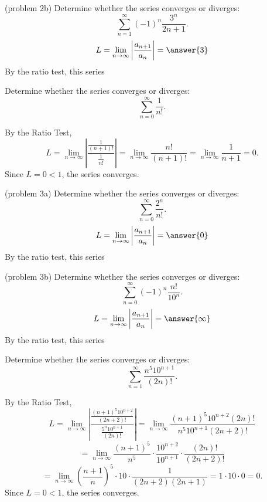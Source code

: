 \documentclass{ximera}
\begin{document}
\begin{problem}(problem 2b)
Determine whether the series converges or diverges:
\[
\sum_{n=1}^\infty (-1)^n\frac{3^n}{2n+1}.
\]
\[
L = \lim_{n \to \infty} \left|\frac{a_{n+1}}{a_n}\right| = \answer{3}
\]
By the ratio test, this series 

\end{problem}



\begin{example}[example 3]
Determine whether the series converges or diverges:
\[
\sum_{n=0}^\infty \frac{1}{n!}.
\]

By the Ratio Test,
\[
L =  \lim_{n \to \infty} \left|\frac{\frac{1}{(n+1)!}}{\frac{1}{n!}}\right| =  \lim_{n \to \infty} \frac{n!}{(n+1)!} =  \lim_{n \to \infty} \frac{1}{n+1} = 0.
\]
Since $L = 0 < 1$, the series converges.
\end{example}



\begin{problem}(problem 3a)
Determine whether the series converges or diverges:
\[
\sum_{n=0}^\infty \frac{2^n}{n!}.
\]
\[
L = \lim_{n \to \infty} \left|\frac{a_{n+1}}{a_n}\right| = \answer{0}
\]
By the ratio test, this series 

\end{problem}



\begin{problem}(problem 3b)
Determine whether the series converges or diverges:
\[
\sum_{n=0}^\infty (-1)^n\frac{n!}{10^n}.
\]
\[
L = \lim_{n \to \infty} \left|\frac{a_{n+1}}{a_n}\right| = \answer{\infty}
\]
By the ratio test, this series 

\end{problem}

\begin{example}[example 4]
Determine whether the series converges or diverges:
\[
\sum_{n=1}^\infty \frac{n^5 10^{n+1}}{(2n)!}.
\]

By the Ratio Test,
\[
L =  \lim_{n \to \infty} \left|\frac{\frac{(n+1)^5 10^{n+2}}{(2n+2)!}}{\frac{5^n 10^{n+1}}{(2n)!}}\right| 
=  \lim_{n \to \infty} \frac{(n+1)^5 10^{n+2}(2n)!}{n^5 10^{n+1}(2n+2)!}
\]
\[
 =  \lim_{n \to \infty} \frac{(n+1)^5}{n^5} \cdot \frac{10^{n+2}}{10^{n+1}} \cdot \frac{(2n)!}{(2n+2)!} 
 \]
 \[
 = 
  \lim_{n \to \infty} \left(\frac{n+1}{n}\right)^5 \cdot 10 \cdot \frac{1}{(2n+2)(2n+1)} = 1 \cdot 10 \cdot 0 = 0.
\]
Since $L = 0 < 1$, the series converges.
\end{example}
\end{document}
